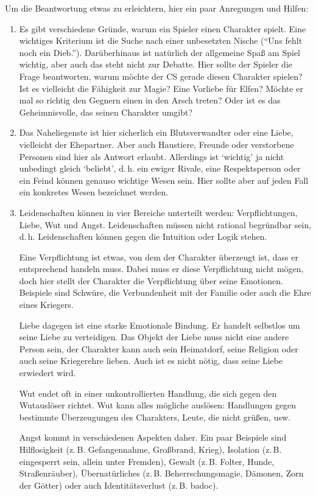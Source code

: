 Um die Beantwortung etwas zu erleichtern, hier ein paar Anregungen und Hilfen:
\begin{enumerate}
  \item Es gibt verschiedene Gründe, warum ein Spieler einen Charakter spielt. Eine wichtiges Kriterium ist die Suche nach einer unbesetzten Nische (``Uns fehlt noch ein Dieb.''). Darüberhinaus ist natürlich der allgemeine Spaß am Spiel wichtig, aber auch das steht nicht zur Debatte. Hier sollte der Spieler die Frage beantworten, warum möchte der CS gerade diesen Charakter spielen? Ist es vielleicht die Fähigkeit zur Magie? Eine Vorliebe für Elfen? Möchte er mal so richtig den Gegnern einen in den Arsch treten? Oder ist es das Geheimnisvolle, das seinen Charakter umgibt?

  \item Das Naheliegenste ist hier sicherlich ein Blutsverwandter oder eine Liebe, vielleicht der Ehepartner. Aber auch Haustiere, Freunde oder verstorbene Personen sind hier als Antwort erlaubt. Allerdings ist `wichtig' ja nicht unbedingt gleich `beliebt', d.\,h. ein ewiger Rivale, eine Respektsperson oder ein Feind können genauso wichtige Wesen sein. Hier sollte aber auf jeden Fall ein konkretes Wesen bezeichnet werden.

  \item Leidenschaften können in vier Bereiche unterteilt werden: Verpflichtungen, Liebe, Wut und Angst. Leidenschaften müssen nicht rational begründbar sein, d.\,h. Leidenschaften können gegen die Intuition oder Logik stehen.

  Eine Verpflichtung ist etwas, von dem der Charakter überzeugt ist, dass er entsprechend handeln muss. Dabei muss er diese Verpflichtung nicht mögen, doch hier stellt der Charakter die Verpflichtung über seine Emotionen. Beispiele sind Schwüre, die Verbundenheit mit der Familie oder auch die Ehre eines Kriegers.

  Liebe dagegen ist eine starke Emotionale Bindung. Er handelt selbstlos um seine Liebe zu verteidigen. Das Objekt der Liebe muss nicht eine andere Person sein, der Charakter kann auch sein Heimatdorf, seine Religion oder auch seine Kriegerehre lieben. Auch ist es nicht nötig, dass seine Liebe erwiedert wird.
  
  Wut endet oft in einer unkontrollierten Handlung, die sich gegen den Wutauslöser richtet. Wut kann alles mögliche auslösen: Handlungen gegen bestimmte Überzeugungen des Charakters, Leute, die nicht grüßen, usw.

  Angst kommt in verschiedenen Aspekten daher. Ein paar Beispiele sind Hilflosigkeit (z.\,B. Gefangennahme, Großbrand, Krieg), Isolation (z.\,B. eingesperrt sein, allein unter Fremden), Gewalt (z.\,B. Folter, Hunde, Straßenräuber), Übernatürliches (z.\,B. Beherrschungsmagie, Dämonen, Zorn der Götter) oder auch Identitätsverlust (z.\,B. badoc).


\end{enumerate}
